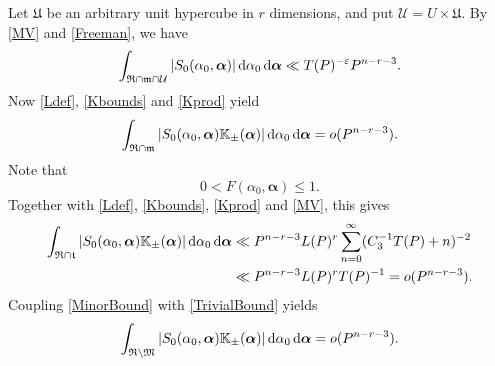 \documentclass[12pt,reqno]{amsart}
\theoremstyle{definition}
\theoremstyle{remark}
\numberwithin{equation}{section}
\begin{document}
Let ${\mathfrak U}$ be an arbitrary unit hypercube in $r$ dimensions, and put ${\mathcal U} = U \times {\mathfrak U}$. By \eqref{MV} and \eqref{Freeman}, we have
\[
\int_{{\mathfrak R} \cap {\mathfrak m} \cap {\mathcal U}} |S_0({{\alpha}}_0,{\boldsymbol{{\alpha}}})|  {{\,{\rm d}}} {{\alpha}}_0 {{\,{\rm d}}} {\boldsymbol{{\alpha}}} \ll T(P)^{-{\varepsilon}} P^{n-r-3}.
\]
Now \eqref{Ldef}, \eqref{Kbounds} and \eqref{Kprod} yield
\begin{equation} \label{MinorBound}
\int_{{\mathfrak R} \cap {\mathfrak m}} |S_0({{\alpha}}_0,{\boldsymbol{{\alpha}}}) {\mathbb K}_\pm ({\boldsymbol{{\alpha}}})|  {{\,{\rm d}}} {{\alpha}}_0 {{\,{\rm d}}} {\boldsymbol{{\alpha}}} = o(P^{n-r-3}).
\end{equation}
Note that
\begin{equation} \label{Ftrivial}
0 < F({{\alpha}}_0,{\boldsymbol{{\alpha}}}) {\leqslant} 1.
\end{equation}
Together with \eqref{Ldef}, \eqref{Kbounds}, \eqref{Kprod} and \eqref{MV}, this gives
\begin{align} \notag 
\int_{{\mathfrak R} \cap {\mathfrak t}} |S_0({{\alpha}}_0,{\boldsymbol{{\alpha}}}) {\mathbb K}_\pm ({\boldsymbol{{\alpha}}})|  {{\,{\rm d}}} {{\alpha}}_0 {{\,{\rm d}}} {\boldsymbol{{\alpha}}} 
&\ll P^{n-r-3} L(P)^r \sum_{n=0}^\infty (C_3^{-1} T(P) + n)^{-2} \\
\label{TrivialBound}
&\ll P^{n-r-3} L(P)^r T(P)^{-1} = o(P^{n-r-3}).
\end{align}
Coupling \eqref{MinorBound} with \eqref{TrivialBound} yields
\[
\int_{{\mathfrak R} \setminus {\mathfrak M}} |S_0({{\alpha}}_0,{\boldsymbol{{\alpha}}}) {\mathbb K}_\pm ({\boldsymbol{{\alpha}}})|  {{\,{\rm d}}} {{\alpha}}_0 {{\,{\rm d}}} {\boldsymbol{{\alpha}}} = o(P^{n-r-3}).
\]
\end{document}
